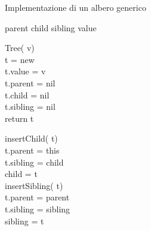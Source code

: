 \begin{code}{Implementazione di un albero generico}
    \begin{minipage}[t]{0.48\textwidth}
         parent\hfill{}
         child\hfill{}
        \mbox{}\hfill{}
         sibling\hfill{}
        \mbox{}\hfill{}
         value\hfill{}

        \ind{} Tree( v)\\
             t = new \\
            t.value = v\\
            t.parent = nil\\
            t.child = nil\\
            t.sibling = nil\\
            return t
    \end{minipage}
    \hfill
    \begin{minipage}[t]{0.48\textwidth}
        \vspace{-8.5pt}
        \rmbreak\ind insertChild( t)\\
            t.parent = this\\
            t.sibling = child\\
            child = t\\
        
        \rmbreak\ind insertSibling( t)\\
                t.parent = parent\\
                t.sibling = sibling\\
                sibling = t\\
    \end{minipage}
\end{code}
